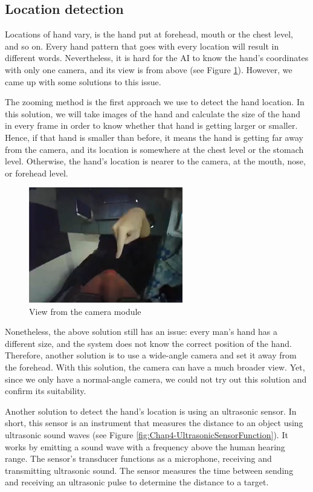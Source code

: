 \subsection{Location detection}

Locations of hand vary, is the hand put at forehead, mouth or the chest level, and so on. Every hand pattern that goes with every location will result in different words. Nevertheless, it is hard for the AI to know the hand's coordinates with only one camera, and its view is from above (see Figure \ref{fig:Chap4-ViewFromCamera}). However, we came up with some solutions to this issue.

The zooming method is the first approach we use to detect the hand location. In this solution, we will take images of the hand and calculate the size of the hand in every frame in order to know whether that hand is getting larger or smaller. Hence, if that hand is smaller than before, it means the hand is getting far away from the camera, and its location is somewhere at the chest level or the stomach level. Otherwise, the hand's location is nearer to the camera, at the mouth, nose, or forehead level.

\begin{figure}[H]
	\centering
	\includegraphics[width=0.6\textwidth]{img/Chap4/ViewFromCamera.png}
	\caption{View from the camera module}
	\label{fig:Chap4-ViewFromCamera}
\end{figure}

Nonetheless, the above solution still has an issue: every man's hand has a different size, and the system does not know the correct position of the hand. Therefore, another solution is to use a wide-angle camera and set it away from the forehead. With this solution, the camera can have a much broader view. Yet, since we only have a normal-angle camera, we could not try out this solution and confirm its suitability.

Another solution to detect the hand's location is using an ultrasonic sensor. In short, this sensor is an instrument that measures the distance to an object using ultrasonic sound waves (see Figure \ref{fig:Chap4-UltrasonicSensorFunction}). It works by emitting a sound wave with a frequency above the human hearing range. The sensor's transducer functions as a microphone, receiving and transmitting ultrasonic sound. The sensor measures the time between sending and receiving an ultrasonic pulse to determine the distance to a target.

